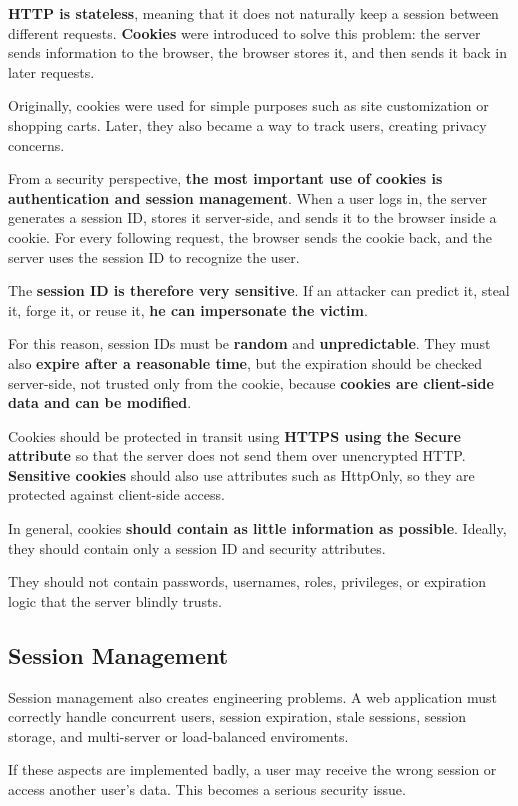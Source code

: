 \documentclass{article}
\begin{document}
\textbf{HTTP is stateless}, meaning that it does not naturally keep a session between different requests. \textbf{Cookies} were introduced to solve this problem: the server sends information to the browser, the browser stores it, and then sends it back in later requests.

Originally, cookies were used for simple purposes such as site customization or shopping carts. Later, they also became a way to track users, creating privacy concerns.

From a security perspective, \textbf{the most important use of cookies is authentication and session management}. When a user logs in, the server generates a session ID, stores it server-side, and sends it to the browser inside a cookie. For every following request, the browser sends the cookie back, and the server uses the session ID to recognize the user.

The \textbf{session ID is therefore very sensitive}. If an attacker can predict it, steal it, forge it, or reuse it, \textbf{he can impersonate the victim}.

For this reason, session IDs must be \textbf{random} and \textbf{unpredictable}. They must also \textbf{expire after a reasonable time}, but the expiration should be checked server-side, not trusted only from the cookie, because \textbf{cookies are client-side data and can be modified}.

Cookies should be protected in transit using \textbf{HTTPS using the Secure attribute} so that the server does not send them over unencrypted HTTP. \textbf{Sensitive cookies} should also use attributes such as HttpOnly, so they are protected against client-side access.

In general, cookies \textbf{should contain as little information as possible}. Ideally, they should contain only a session ID and security attributes.

They should not contain passwords, usernames, roles, privileges, or expiration logic that the server blindly trusts.

\subsection{Session Management}

Session management also creates engineering problems. A web application must correctly handle concurrent users, session expiration, stale sessions, session storage, and multi-server or load-balanced enviroments.

If these aspects are implemented badly, a user may receive the wrong session or access another user's data. This becomes a serious security issue.
\end{document}
